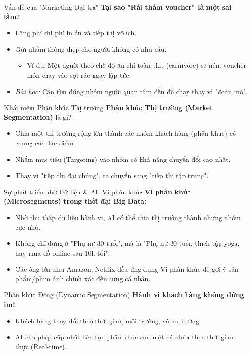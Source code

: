 \documentclass[aspectratio=169]{beamer}
\begin{document}
\begin{frame}{Vấn đề của "Marketing Đại trà"}
    \textbf{Tại sao "Rải thảm voucher" là một sai lầm?}
    \begin{itemize}
        \item Lãng phí chi phí in ấn và tiếp thị vô ích.
        \item Gửi nhầm thông điệp cho người không có nhu cầu.
        \begin{itemize}
            \item Ví dụ: Một người theo chế độ ăn chỉ toàn thịt (carnivore) sẽ ném voucher món chay vào sọt rác ngay lập tức.
        \end{itemize}
        \item \textit{Bài học:} Cần tìm đúng nhóm người quan tâm đến đồ chay thay vì "đoán mò".
    \end{itemize}
\end{frame}

\begin{frame}{Khái niệm Phân khúc Thị trường}
    \textbf{Phân khúc Thị trường (Market Segmentation)} là gì?
    \begin{itemize}
        \item Chia một thị trường rộng lớn thành các nhóm khách hàng (phân khúc) có chung các đặc điểm.
        \item Nhắm mục tiêu (Targeting) vào nhóm có khả năng chuyển đổi cao nhất.
        \item Thay vì "tiếp thị đại chúng", ta chuyển sang "tiếp thị tập trung".
    \end{itemize}
\end{frame}

\begin{frame}{Sự phát triển nhờ Dữ liệu \& AI: Vi phân khúc}
    \textbf{Vi phân khúc (Microsegments) trong thời đại Big Data:}
    \begin{itemize}
        \item Nhờ thu thập dữ liệu hành vi, AI có thể chia thị trường thành những nhóm cực nhỏ.
        \item Không chỉ dừng ở "Phụ nữ 30 tuổi", mà là "Phụ nữ 30 tuổi, thích tập yoga, hay mua đồ online sau 10h tối".
        \item Các ông lớn như Amazon, Netflix đều ứng dụng Vi phân khúc để gợi ý sản phẩm/phim ảnh chính xác đến từng cá nhân.
    \end{itemize}
\end{frame}

\begin{frame}{Phân khúc Động (Dynamic Segmentation)}
    \textbf{Hành vi khách hàng không đứng im!}
    \begin{itemize}
        \item Khách hàng thay đổi theo thời gian, môi trường, và xu hướng.
        \item AI cho phép cập nhật liên tục phân khúc của một cá nhân theo thời gian thực (Real-time).
    \end{itemize}
\end{frame}
\end{document}
